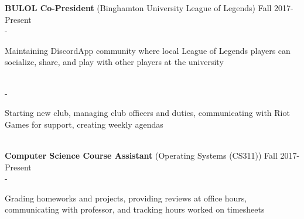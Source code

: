 \documentclass[11pt]{article}
\begin{document}
        \indent\small{\textbf{BULOL Co-President} (Binghamton University League of Legends)} \hfill \small{Fall 2017-Present}\indent\vspace{0.5mm}\\
            \indent\indent - \begin{minipage}{\dimexpr\textwidth-7cm}
                \small{ Maintaining DiscordApp community where local League of Legends players can socialize, share, and play with other players at the university}
            \end{minipage}\vspace{1mm}\\
            \indent\indent - \begin{minipage}{\dimexpr\textwidth-7cm}
                \small{ Starting new club, managing club officers and duties, communicating with Riot Games for support, creating weekly agendas}
            \end{minipage}\vspace{1mm}\\
        \indent\small{\textbf{Computer Science Course Assistant} (Operating Systems (CS311))} \hfill \small{Fall 2017-Present}\indent\vspace{0.5mm}\\
            \indent\indent - \begin{minipage}{\dimexpr\textwidth-7cm}
                \small{ Grading homeworks and projects, providing reviews at office hours, communicating with professor, and tracking hours worked on timesheets}
            \end{minipage}\vspace{1mm}
\end{document}
